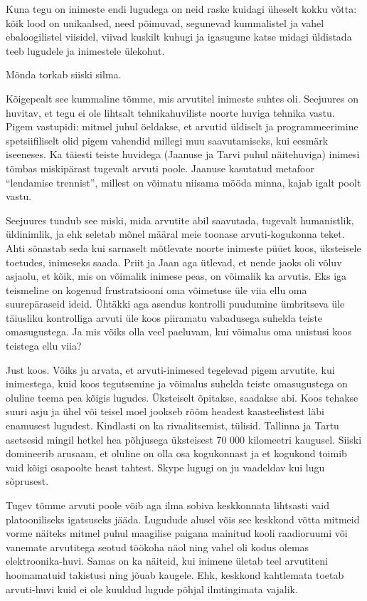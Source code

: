 Kuna tegu on inimeste endi lugudega on neid raske kuidagi üheselt kokku võtta: kõik lood on unikaalsed, need põimuvad, segunevad kummalistel ja vahel ebaloogilistel viisidel, viivad kuskilt kuhugi ja igasugune katse midagi üldistada teeb lugudele ja inimestele ülekohut. 

Mõnda  torkab siiski silma. 

Kõigepealt see kummaline tõmme, mis arvutitel inimeste suhtes oli. Seejuures on huvitav, et tegu ei ole lihtsalt tehnikahuviliste noorte huviga tehnika vastu. Pigem vastupidi: mitmel juhul öeldakse, et arvutid üldiselt ja programmeerimine spetsiifiliselt olid pigem vahendid millegi muu saavutamiseks, kui eesmärk iseeneses. Ka täiesti teiste huvidega (Jaanuse ja Tarvi puhul näitehuviga) inimesi tõmbas miskipärast tugevalt arvuti poole. Jaanuse kasutatud metafoor \enquote{lendamise trennist}, millest on võimatu niisama mööda minna, kajab igalt poolt vastu. 

Seejuures tundub see miski, mida arvutite abil saavutada, tugevalt humanistlik, üldinimlik, ja ehk seletab mõnel määral meie toonase arvuti-kogukonna teket. Ahti sõnastab seda kui sarnaselt mõtlevate noorte inimeste püüet koos, üksteisele toetudes, inimeseks saada. Priit ja Jaan aga ütlevad, et nende jaoks oli võluv asjaolu, et kõik, mis on võimalik inimese peas, on võimalik ka arvutis. Eks iga teismeline on kogenud frustratsiooni oma võimetuse üle viia ellu oma suurepäraseid ideid. Ühtäkki aga asendus kontrolli puudumine ümbritseva üle täiusliku kontrolliga arvuti üle koos piiramatu vabadusega suhelda teiste omasugustega.  Ja mis võiks olla veel paeluvam, kui võimalus oma unistusi koos teistega ellu viia?

Just koos. Võiks ju arvata, et arvuti-inimesed tegelevad pigem arvutite, kui inimestega, kuid koos tegutsemine ja võimalus suhelda teiste omasugustega on oluline teema pea kõigis lugudes. Üksteiselt õpitakse, saadakse abi. Koos tehakse suuri asju ja ühel või teisel moel jookseb rõõm headest kaasteelistest läbi enamusest lugudest. Kindlasti on ka rivaalitsemist, tülisid. Tallinna ja Tartu asetsesid mingil hetkel hea põhjusega üksteisest 70 000 kilomeetri kaugusel. Siiski domineerib arusaam, et oluline on olla osa kogukonnast ja et kogukond toimib vaid kõigi osapoolte heast tahtest. Skype lugugi on ju vaadeldav kui lugu sõprusest.

Tugev tõmme arvuti poole võib  aga ilma sobiva keskkonnata lihtsasti vaid platooniliseks igatsuseks jääda. Lugudude alusel  võis see keskkond võtta mitmeid vorme näiteks mitmel puhul maagilise paigana mainitud kooli raadioruumi või vanemate arvutitega seotud töökoha näol ning vahel oli kodus olemas elektroonika-huvi. Samas on ka näiteid, kui inimene ületab teel arvutiteni hoomamatuid takistusi ning jõuab kaugele. Ehk, keskkond kahtlemata toetab arvuti-huvi kuid ei ole kuuldud lugude põhjal ilmtingimata vajalik.


